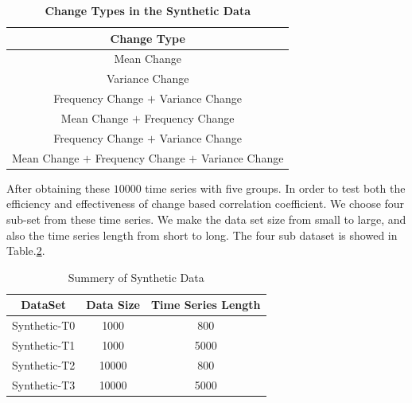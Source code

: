 \begin{table}[t]
\caption{\textbf{Change Types in the Synthetic Data}}
\centering
\begin{tabular}{|c|}
\hline Change Type \\
\hline Mean Change \\
\hline Variance Change\\
\hline Frequency Change $+$ Variance Change\\
\hline Mean Change $+$ Frequency Change \\
\hline Frequency Change $+$ Variance Change\\
\hline Mean Change $+$ Frequency Change $+$ Variance Change\\
\hline
\end{tabular}
\label{Tab:ChangeType}
\end{table}

After obtaining these $10000$ time series with five groups.
In order to test both the efficiency and effectiveness of change based correlation coefficient. 
We choose four sub-set from these time series. 
We make the data set size from small to large, and also the time series length from short to long. The four sub dataset is showed in Table.\ref{Tab:SDataScale}. 

\begin{table}[t]
\caption{Summery of Synthetic Data}
\centering

\begin{tabular}{|c|c|c|}
\hline DataSet &  Data Size & Time Series Length\\
\hline Synthetic-T0 & 1000 & 800 \\
\hline Synthetic-T1 & 1000 & 5000 \\
\hline Synthetic-T2 & 10000 & 800 \\
\hline Synthetic-T3 & 10000 & 5000 \\
\hline
\end{tabular}
\label{Tab:SDataScale}
\end{table}


